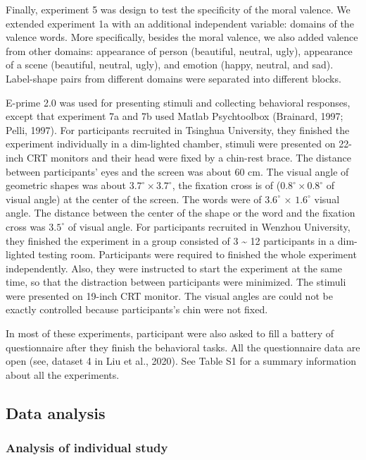 \documentclass[
  english,
  man]{apa6}
\begin{document}
Finally, experiment 5 was design to test the specificity of the moral valence. We extended experiment 1a with an additional independent variable: domains of the valence words. More specifically, besides the moral valence, we also added valence from other domains: appearance of person (beautiful, neutral, ugly), appearance of a scene (beautiful, neutral, ugly), and emotion (happy, neutral, and sad). Label-shape pairs from different domains were separated into different blocks.

E-prime 2.0 was used for presenting stimuli and collecting behavioral responses, except that experiment 7a and 7b used Matlab Psychtoolbox (Brainard, 1997; Pelli, 1997). For participants recruited in Tsinghua University, they finished the experiment individually in a dim-lighted chamber, stimuli were presented on 22-inch CRT monitors and their head were fixed by a chin-rest brace. The distance between participants' eyes and the screen was about 60 cm. The visual angle of geometric shapes was about \(3.7^\circ × 3.7^\circ\), the fixation cross is of (\(0.8^\circ × 0.8^\circ\) of visual angle) at the center of the screen. The words were of \(3.6^\circ\) × \(1.6^\circ\) visual angle. The distance between the center of the shape or the word and the fixation cross was \(3.5^\circ\) of visual angle. For participants recruited in Wenzhou University, they finished the experiment in a group consisted of 3 \textasciitilde{} 12 participants in a dim-lighted testing room. Participants were required to finished the whole experiment independently. Also, they were instructed to start the experiment at the same time, so that the distraction between participants were minimized. The stimuli were presented on 19-inch CRT monitor. The visual angles are could not be exactly controlled because participants's chin were not fixed.

In most of these experiments, participant were also asked to fill a battery of questionnaire after they finish the behavioral tasks. All the questionnaire data are open (see, dataset 4 in Liu et al., 2020). See Table S1 for a summary information about all the experiments.

\hypertarget{data-analysis}{%
\subsection{Data analysis}\label{data-analysis}}

\hypertarget{analysis-of-individual-study}{%
\subsubsection{Analysis of individual study}\label{analysis-of-individual-study}}
\end{document}
